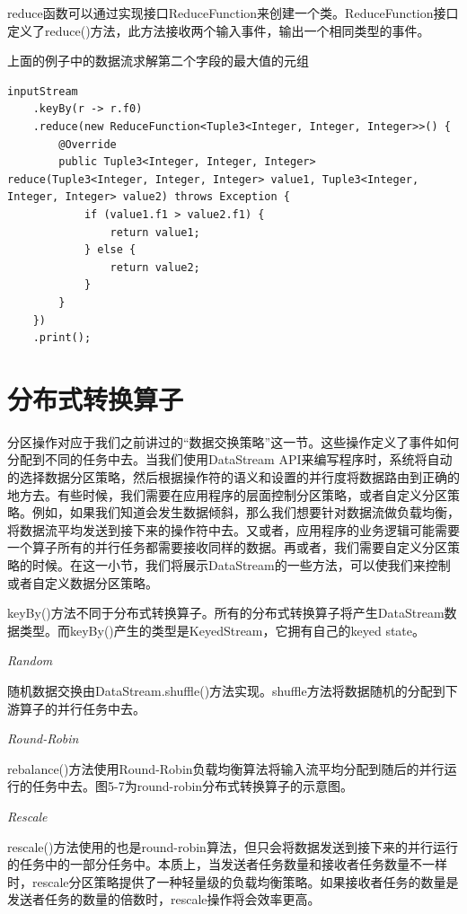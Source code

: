 \documentclass[cn,11pt,chinese]{elegantbook}
\begin{document}
reduce函数可以通过实现接口ReduceFunction来创建一个类。ReduceFunction接口定义了reduce()方法，此方法接收两个输入事件，输出一个相同类型的事件。

上面的例子中的数据流求解第二个字段的最大值的元组

\begin{verbatim}
inputStream
    .keyBy(r -> r.f0)
    .reduce(new ReduceFunction<Tuple3<Integer, Integer, Integer>>() {
        @Override
        public Tuple3<Integer, Integer, Integer> reduce(Tuple3<Integer, Integer, Integer> value1, Tuple3<Integer, Integer, Integer> value2) throws Exception {
            if (value1.f1 > value2.f1) {
                return value1;
            } else {
                return value2;
            }
        }
    })
    .print();
\end{verbatim}

\section{分布式转换算子}

分区操作对应于我们之前讲过的“数据交换策略”这一节。这些操作定义了事件如何分配到不同的任务中去。当我们使用DataStream API来编写程序时，系统将自动的选择数据分区策略，然后根据操作符的语义和设置的并行度将数据路由到正确的地方去。有些时候，我们需要在应用程序的层面控制分区策略，或者自定义分区策略。例如，如果我们知道会发生数据倾斜，那么我们想要针对数据流做负载均衡，将数据流平均发送到接下来的操作符中去。又或者，应用程序的业务逻辑可能需要一个算子所有的并行任务都需要接收同样的数据。再或者，我们需要自定义分区策略的时候。在这一小节，我们将展示DataStream的一些方法，可以使我们来控制或者自定义数据分区策略。

\begin{note}
    keyBy()方法不同于分布式转换算子。所有的分布式转换算子将产生DataStream数据类型。而keyBy()产生的类型是KeyedStream，它拥有自己的keyed state。
\end{note}

\textit{Random}

随机数据交换由DataStream.shuffle()方法实现。shuffle方法将数据随机的分配到下游算子的并行任务中去。

\textit{Round-Robin}

rebalance()方法使用Round-Robin负载均衡算法将输入流平均分配到随后的并行运行的任务中去。图5-7为round-robin分布式转换算子的示意图。

\textit{Rescale}

rescale()方法使用的也是round-robin算法，但只会将数据发送到接下来的并行运行的任务中的一部分任务中。本质上，当发送者任务数量和接收者任务数量不一样时，rescale分区策略提供了一种轻量级的负载均衡策略。如果接收者任务的数量是发送者任务的数量的倍数时，rescale操作将会效率更高。
\end{document}
